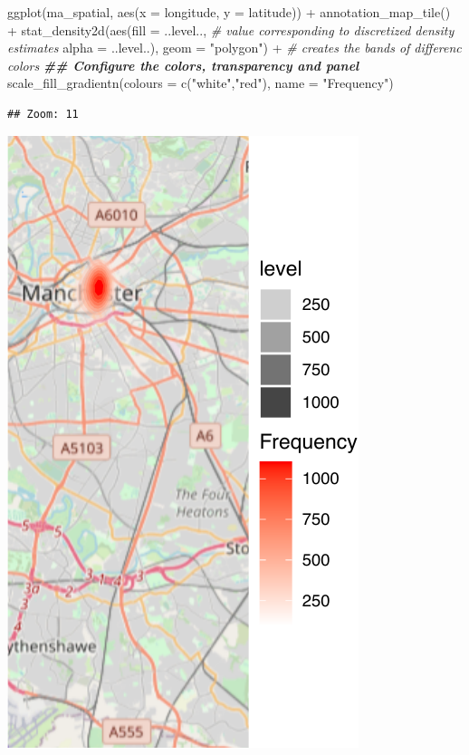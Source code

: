\documentclass[
]{book}
\newenvironment{Shaded}{\begin{snugshade}}{\end{snugshade}}
\newcommand{\AttributeTok}[1]{\textcolor[rgb]{0.77,0.63,0.00}{#1}}
\newcommand{\CommentTok}[1]{\textcolor[rgb]{0.56,0.35,0.01}{\textit{#1}}}
\newcommand{\DocumentationTok}[1]{\textcolor[rgb]{0.56,0.35,0.01}{\textbf{\textit{#1}}}}
\newcommand{\FunctionTok}[1]{\textcolor[rgb]{0.00,0.00,0.00}{#1}}
\newcommand{\NormalTok}[1]{#1}
\newcommand{\SpecialCharTok}[1]{\textcolor[rgb]{0.00,0.00,0.00}{#1}}
\newcommand{\StringTok}[1]{\textcolor[rgb]{0.31,0.60,0.02}{#1}}
\begin{document}
\begin{Shaded}
\begin{Highlighting}[]
\FunctionTok{ggplot}\NormalTok{(ma\_spatial, }\FunctionTok{aes}\NormalTok{(}\AttributeTok{x =}\NormalTok{ longitude, }\AttributeTok{y =}\NormalTok{ latitude)) }\SpecialCharTok{+} 
  \FunctionTok{annotation\_map\_tile}\NormalTok{() }\SpecialCharTok{+} 
  \FunctionTok{stat\_density2d}\NormalTok{(}\FunctionTok{aes}\NormalTok{(}\AttributeTok{fill =}\NormalTok{ ..level.., }\CommentTok{\# value corresponding to discretized density estimates }
                     \AttributeTok{alpha =}\NormalTok{ ..level..), }
                 \AttributeTok{geom =} \StringTok{"polygon"}\NormalTok{) }\SpecialCharTok{+}  \CommentTok{\# creates the bands of differenc colors}
  \DocumentationTok{\#\# Configure the colors, transparency and panel}
  \FunctionTok{scale\_fill\_gradientn}\NormalTok{(}\AttributeTok{colours =} \FunctionTok{c}\NormalTok{(}\StringTok{"white"}\NormalTok{,}\StringTok{"red"}\NormalTok{), }
                       \AttributeTok{name =} \StringTok{"Frequency"}\NormalTok{) }
\end{Highlighting}
\end{Shaded}

\begin{verbatim}
## Zoom: 11
\end{verbatim}

\includegraphics{crime_mapping_files/figure-latex/unnamed-chunk-130-1.pdf}
\end{document}
